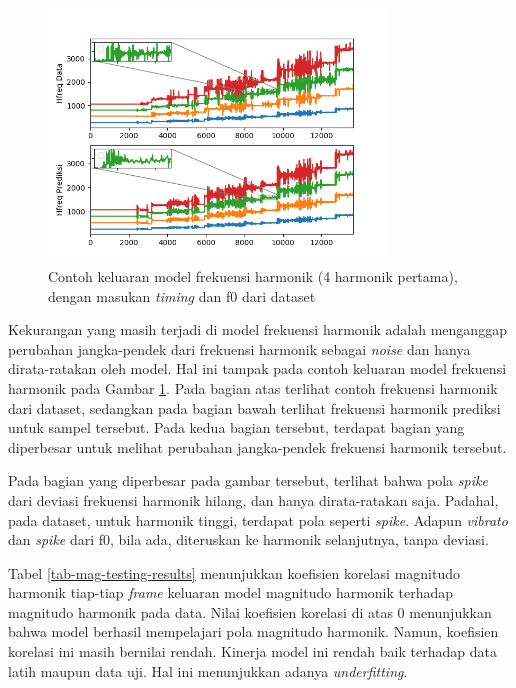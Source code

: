 \begin{figure}[h]
    \centering
    \includegraphics[width=0.8\textwidth]{resources/Analisis_Hfreq.png}
    \caption{Contoh keluaran model frekuensi harmonik (4 harmonik pertama), dengan masukan \textit{timing} dan f0 dari dataset}\label{fig-hfreq-output-sample}
\end{figure}

Kekurangan yang masih terjadi di model frekuensi harmonik adalah menganggap perubahan jangka-pendek dari frekuensi harmonik sebagai \textit{noise} dan hanya dirata-ratakan oleh model. Hal ini tampak pada contoh keluaran model frekuensi harmonik pada Gambar \ref{fig-hfreq-output-sample}. Pada bagian atas terlihat contoh frekuensi harmonik dari dataset, sedangkan pada bagian bawah terlihat frekuensi harmonik prediksi untuk sampel tersebut. Pada kedua bagian tersebut, terdapat bagian yang diperbesar untuk melihat perubahan jangka-pendek frekuensi harmonik tersebut. 

Pada bagian yang diperbesar pada gambar tersebut, terlihat bahwa pola \textit{spike} dari deviasi frekuensi harmonik hilang, dan hanya dirata-ratakan saja. Padahal, pada dataset, untuk harmonik tinggi, terdapat pola seperti \textit{spike}. Adapun \textit{vibrato} dan \textit{spike} dari f0, bila ada, diteruskan ke harmonik selanjutnya, tanpa deviasi.

Tabel \ref{tab-mag-testing-results} menunjukkan koefisien korelasi magnitudo harmonik tiap-tiap \textit{frame} keluaran model magnitudo harmonik terhadap magnitudo harmonik pada data. Nilai koefisien korelasi di atas 0 menunjukkan bahwa model berhasil mempelajari pola magnitudo harmonik. Namun, koefisien korelasi ini masih bernilai rendah. Kinerja model ini rendah baik terhadap data latih maupun data uji. Hal ini menunjukkan adanya \textit{underfitting}.

